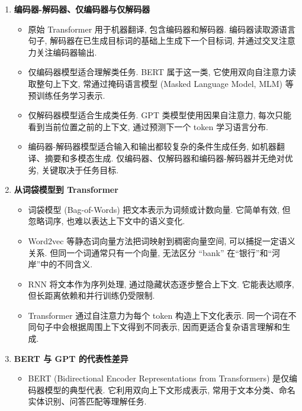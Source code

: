 \documentclass{../nndlcourse}
\begin{document}
\begin{enumerate}
\begin{itemize}
      \item 最大路径长度衡量两个远距离位置之间需要经过多少计算步骤才能交互. Transformer 中任意两个位置在同一层自注意力中即可直接交互, 因此路径长度为 $O(1)$.
      \item Transformer 的主要代价是注意力矩阵大小为 $L\times L$, 因而长序列场景下计算和显存开销明显. 这也是稀疏注意力、局部注意力、线性注意力和缓存机制等方法被提出的重要原因.
    \end{itemize}
  \item \textbf{编码器-解码器、仅编码器与仅解码器}
    \begin{itemize}
      \item 原始 Transformer 用于机器翻译, 包含编码器和解码器. 编码器读取源语言句子, 解码器在已生成目标词的基础上生成下一个目标词, 并通过交叉注意力关注编码器输出.
      \item 仅编码器模型适合理解类任务. BERT 属于这一类, 它使用双向自注意力读取整句上下文, 常通过掩码语言模型 (Masked Language Model, MLM) 等预训练任务学习表示.
      \item 仅解码器模型适合生成类任务. GPT 类模型使用因果自注意力, 每次只能看到当前位置之前的上下文, 通过预测下一个 token 学习语言分布.
      \item 编码器-解码器模型适合输入和输出都较复杂的条件生成任务, 如机器翻译、摘要和多模态生成. 仅编码器、仅解码器和编码器-解码器并无绝对优劣, 关键取决于任务目标.
    \end{itemize}
  \item \textbf{从词袋模型到 Transformer}
    \begin{itemize}
      \item 词袋模型 (Bag-of-Words) 把文本表示为词频或计数向量. 它简单有效, 但忽略词序, 也难以表达上下文中的语义变化.
      \item Word2vec 等静态词向量方法把词映射到稠密向量空间, 可以捕捉一定语义关系. 但同一个词通常只有一个向量, 无法区分 ``bank'' 在“银行”和“河岸”中的不同含义.
      \item RNN 将文本作为序列处理, 通过隐藏状态逐步整合上下文. 它能表达顺序, 但长距离依赖和并行训练仍受限制.
      \item Transformer 通过自注意力为每个 token 构造上下文化表示. 同一个词在不同句子中会根据周围上下文得到不同表示, 因而更适合复杂语言理解和生成.
    \end{itemize}
  \item \textbf{BERT 与 GPT 的代表性差异}
    \begin{itemize}
      \item BERT (Bidirectional Encoder Representations from Transformers) 是仅编码器模型的典型代表. 它利用双向上下文形成表示, 常用于文本分类、命名实体识别、问答匹配等理解任务.

\end{itemize}
\end{enumerate}
\end{document}
